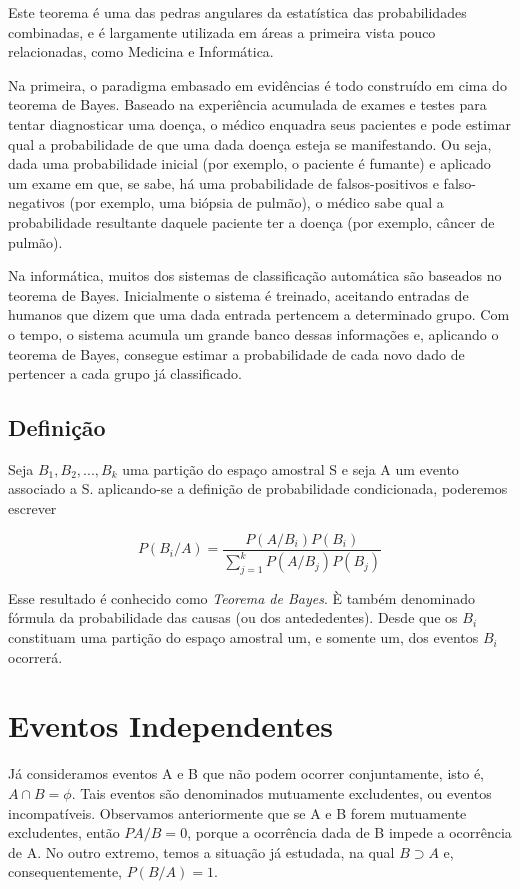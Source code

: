 Este teorema é uma das pedras angulares da estatística das
probabilidades combinadas, e é largamente utilizada em áreas a
primeira vista pouco relacionadas, como Medicina e
Informática.\vskip0.3cm

Na primeira, o paradigma embasado em evidências é todo construído
em cima do teorema de Bayes. Baseado na experiência acumulada de
exames e testes para tentar diagnosticar uma doença, o médico
enquadra seus pacientes e pode estimar qual a probabilidade de que
uma dada doença esteja se manifestando. Ou seja, dada uma
probabilidade inicial (por exemplo, o paciente é fumante) e
aplicado um exame em que, se sabe, há uma probabilidade de
falsos-positivos e falso-negativos (por exemplo, uma biópsia de
pulmão), o médico sabe qual a probabilidade resultante daquele
paciente ter a doença (por exemplo, câncer de pulmão).\vskip0.3cm

Na informática, muitos dos sistemas de classificação automática
são baseados no teorema de Bayes. Inicialmente o sistema é
treinado, aceitando entradas de humanos que dizem que uma dada
entrada pertencem a determinado grupo. Com o tempo, o sistema
acumula um grande banco dessas informações e, aplicando o teorema
de Bayes, consegue estimar a probabilidade de cada novo dado de
pertencer a cada grupo já classificado.\vskip0.3cm


\subsection{Definição}

Seja $B_{1},B_{2},...,B_{k}$ uma partição do espaço amostral S e
seja A um evento associado a S. aplicando-se a definição de
probabilidade condicionada, poderemos escrever


\begin{equation}\label{bayes}
    P(B_{i}/A)=\frac{P(A/B_{i})P(B_{i})}{\sum_{j=1}^{k}P(A/B_{j})P(B_{j})}
\end{equation}


Esse resultado é conhecido como \emph{Teorema de Bayes}. È também
denominado fórmula da probabilidade das causas (ou dos
antededentes). Desde que os $B_{i}$ constituam uma partição do
espaço amostral um, e somente um, dos eventos $B_{i}$ ocorrerá.

\section{Eventos Independentes}

Já consideramos eventos A e B que não podem ocorrer conjuntamente,
isto é, $A\cap B = \phi$. Tais eventos são denominados mutuamente
excludentes, ou eventos incompatíveis. Observamos anteriormente
que se A e B forem mutuamente excludentes, então $PA/B=0$, porque
a ocorrência dada de B impede a ocorrência de A. No outro extremo,
temos a situação já estudada, na qual $B \supset A$ e,
consequentemente, $P(B/A)=1$.\vskip0.3cm

